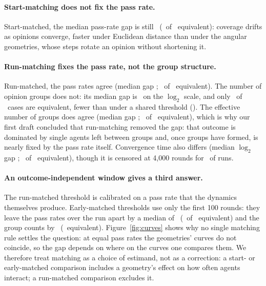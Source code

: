 \documentclass[11pt]{article}
\begin{document}
\paragraph{Start-matching does not fix the pass rate.}
Start-matched, the median pass-rate gap is still \VTzeroPassGap\ (\VTzeroPassEquiv\ of \VCases\ equivalent): coverage drifts as opinions converge, faster under Euclidean distance than under the angular geometries, whose steps rotate an opinion without shortening it.

\paragraph{Run-matching fixes the pass rate, not the group structure.}
Run-matched, the pass rates agree (median gap \VRunPassGap; \VRunPassEquiv\ of \VCases\ equivalent).
The number of opinion groups does not: its median gap is \VRunGroupGap\ on the $\log_2$ scale, and only \VRunGroupEquiv\ of \VCases\ cases are equivalent, fewer than under a shared threshold (\VRawGroupEquiv).
The effective number of groups does agree (median gap \VRunEffGroupsGap; \VRunEffGroupsEquiv\ of \VCases\ equivalent), which is why our first draft concluded that run-matching removed the gap: that outcome is dominated by single agents left between groups and, once groups have formed, is nearly fixed by the pass rate itself.
Convergence time also differs (median $\log_2$ gap \VRunConvGap; \VRunConvEquiv\ of \VCases\ equivalent), though it is censored at 4{,}000 rounds for \VConvCensored\ of runs.

\paragraph{An outcome-independent window gives a third answer.}
The run-matched threshold is calibrated on a pass rate that the dynamics themselves produce.
Early-matched thresholds use only the first 100 rounds: they leave the pass rates over the run apart by a median of \VEarlyPassGap\ (\VEarlyPassEquiv\ of \VCases\ equivalent) and the group counts by \VEarlyGroupGap\ (\VEarlyGroupEquiv\ equivalent).
Figure~\ref{fig:curves} shows why no single matching rule settles the question: at equal pass rates the geometries' curves do not coincide, so the gap depends on where on the curves one compares them.
We therefore treat matching as a choice of estimand, not as a correction: a start- or early-matched comparison includes a geometry's effect on how often agents interact; a run-matched comparison excludes it.
\end{document}
